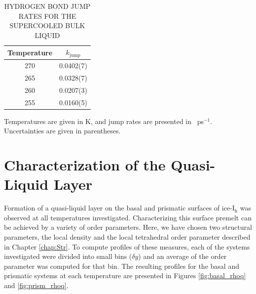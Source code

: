 \begin{table}[h] \centering \caption{HYDROGEN BOND JUMP RATES FOR THE
    SUPERCOOLED BULK LIQUID\label{tab:bulkJump}}
\begin{tabular}{cc}
\hline
\hline
 Temperature & $k_\mathrm{jump}$ \\
\hline
270 & 0.0402(7) \\
265 & 0.0328(7) \\
260 & 0.0207(3)  \\
255 & 0.0160(5) \\
\hline
\hline
\end{tabular}
\begin{flushleft}
  Temperatures are given in K, and jump rates are presented in
  ~ps$^{-1}$. Uncertainties are given in parentheses.
\end{flushleft}
\end{table}


\section{Characterization of the Quasi-Liquid Layer}
Formation of a quasi-liquid layer on the basal and prismatic surfaces
of ice-I$_\mathrm{h}$ was observed at all temperatures
investigated. Characterizing this surface premelt can be achieved by a
variety of order parameters. Here, we have chosen two structural
parameters, the local density and the local tetrahedral order
parameter described in Chapter \ref{chap:Str}. To compute profiles of
these measures, each of the systems investigated were divided into
small bins ($\delta y$) and an average of the order parameter was
computed for that bin. The resulting profiles for the basal and
prismatic systems at each temperature are presented in Figures
\ref{fig:basal_rhoq} and \ref{fig:prism_rhoq}.

